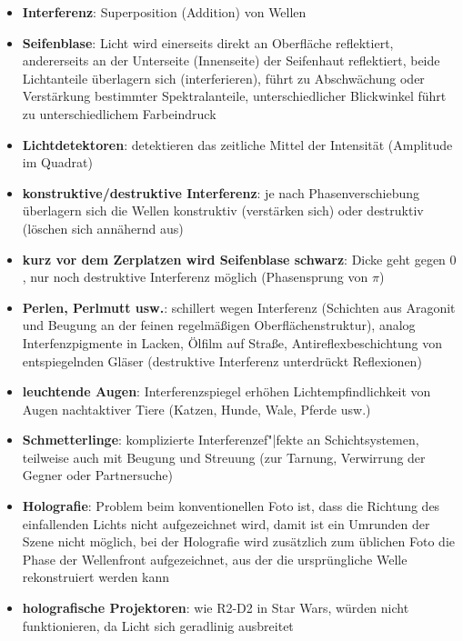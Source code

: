 \begin{itemize}
    \item
    \textbf{Interferenz}:
    Superposition (Addition) von Wellen
    
    \item
    \textbf{Seifenblase}:
    Licht wird einerseits direkt an Oberfläche reflektiert,
    andererseits an der Unterseite (Innenseite) der Seifenhaut reflektiert,
    beide Lichtanteile überlagern sich (interferieren),
    führt zu Abschwächung oder Verstärkung bestimmter Spektralanteile,
    unterschiedlicher Blickwinkel führt zu unterschiedlichem Farbeindruck
    
    \item
    \textbf{Lichtdetektoren}:
    detektieren das zeitliche Mittel der Intensität (Amplitude im Quadrat)
    
    \item
    \textbf{konstruktive/destruktive Interferenz}:
    je nach Phasenverschiebung überlagern sich die Wellen konstruktiv
    (verstärken sich) oder destruktiv (löschen sich annähernd aus)
    
    \item
    \textbf{kurz vor dem Zerplatzen wird Seifenblase schwarz}:
    Dicke geht gegen $0$, nur noch destruktive Interferenz möglich
    (Phasensprung von $\pi$)
    
    \item
    \textbf{Perlen, Perlmutt usw.}:
    schillert wegen Interferenz
    (Schichten aus Aragonit und Beugung an der feinen regelmäßigen
    Oberflächenstruktur),
    analog Interfenzpigmente in Lacken,
    Ölfilm auf Straße,
    Antireflexbeschichtung von entspiegelnden Gläser
    (destruktive Interferenz unterdrückt Reflexionen)
    
    \item
    \textbf{leuchtende Augen}:
    Interferenzspiegel erhöhen Lichtempfindlichkeit von Augen nachtaktiver
    Tiere (Katzen, Hunde, Wale, Pferde usw.)
    
    \item
    \textbf{Schmetterlinge}:
    komplizierte Interferenzef"|fekte an Schichtsystemen, teilweise auch mit
    Beugung und Streuung
    (zur Tarnung, Verwirrung der Gegner oder Partnersuche)
\end{itemize}
\linie
\begin{itemize}
    \item
    \textbf{Holografie}:
    Problem beim konventionellen Foto ist,
    dass die Richtung des einfallenden Lichts nicht aufgezeichnet wird,
    damit ist ein Umrunden der Szene nicht möglich,
    bei der Holografie wird zusätzlich zum üblichen Foto die Phase der
    Wellenfront aufgezeichnet, aus der die ursprüngliche Welle
    rekonstruiert werden kann
    
    \item
    \textbf{holografische Projektoren}:
    wie R2-D2 in Star Wars,
    würden nicht funktionieren, da Licht sich geradlinig ausbreitet
\end{itemize}
